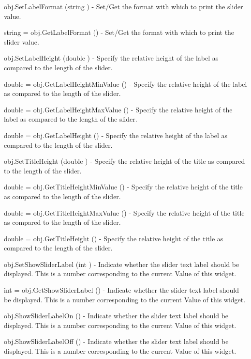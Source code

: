 \begin{DoxyItemize}
\item {\ttfamily obj.\-Set\-Label\-Format (string )} -\/ Set/\-Get the format with which to print the slider value.  
\item {\ttfamily string = obj.\-Get\-Label\-Format ()} -\/ Set/\-Get the format with which to print the slider value.  
\item {\ttfamily obj.\-Set\-Label\-Height (double )} -\/ Specify the relative height of the label as compared to the length of the slider.  
\item {\ttfamily double = obj.\-Get\-Label\-Height\-Min\-Value ()} -\/ Specify the relative height of the label as compared to the length of the slider.  
\item {\ttfamily double = obj.\-Get\-Label\-Height\-Max\-Value ()} -\/ Specify the relative height of the label as compared to the length of the slider.  
\item {\ttfamily double = obj.\-Get\-Label\-Height ()} -\/ Specify the relative height of the label as compared to the length of the slider.  
\item {\ttfamily obj.\-Set\-Title\-Height (double )} -\/ Specify the relative height of the title as compared to the length of the slider.  
\item {\ttfamily double = obj.\-Get\-Title\-Height\-Min\-Value ()} -\/ Specify the relative height of the title as compared to the length of the slider.  
\item {\ttfamily double = obj.\-Get\-Title\-Height\-Max\-Value ()} -\/ Specify the relative height of the title as compared to the length of the slider.  
\item {\ttfamily double = obj.\-Get\-Title\-Height ()} -\/ Specify the relative height of the title as compared to the length of the slider.  
\item {\ttfamily obj.\-Set\-Show\-Slider\-Label (int )} -\/ Indicate whether the slider text label should be displayed. This is a number corresponding to the current Value of this widget.  
\item {\ttfamily int = obj.\-Get\-Show\-Slider\-Label ()} -\/ Indicate whether the slider text label should be displayed. This is a number corresponding to the current Value of this widget.  
\item {\ttfamily obj.\-Show\-Slider\-Label\-On ()} -\/ Indicate whether the slider text label should be displayed. This is a number corresponding to the current Value of this widget.  
\item {\ttfamily obj.\-Show\-Slider\-Label\-Off ()} -\/ Indicate whether the slider text label should be displayed. This is a number corresponding to the current Value of this widget.  

\end{DoxyItemize}
